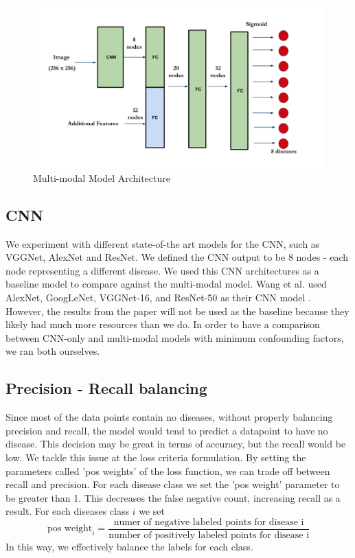 \documentclass[10pt,letterpaper]{article}
\begin{document}
\begin{figure}[h]
	\centering
	\includegraphics[scale=0.7]{./model_image.png}
	\caption{Multi-modal Model Architecture}
	\label{architecture}
\end{figure}

\subsection{CNN}
We experiment with different state-of-the art models for the CNN, such as VGGNet, AlexNet and ResNet. We defined the CNN output to be 8 nodes - each node representing a different disease. We used this CNN architectures as a baseline model to compare against the multi-modal model. Wang et al. used AlexNet, GoogLeNet, VGGNet-16, and ResNet-50 as their CNN model \cite{1705.02315}. However, the results from the paper will not be used as the baseline because they likely had much more resources than we do. In order to have a comparison between CNN-only and multi-modal models with minimum confounding factors, we ran both ourselves.

\subsection{Precision - Recall balancing}
Since most of the data points contain no diseases, without properly balancing precision and recall, the model would tend to predict a datapoint to have no disease. This decision may be great in terms of accuracy, but the recall would be low. We tackle this issue at the loss criteria formulation. By setting the parameters called 'pos weights' of the loss function, we can trade off between recall and precision. For each disease class we set the 'pos weight' parameter to be greater than 1. This decreases the false negative count, increasing recall as a result. For each diseases class $i$ we set 
$$ \text{pos weight}_i = \frac{\text{numer of negative labeled points for disease i}}{\text{number  of positively labeled points for disease i}}$$
In this way, we effectively balance the labels for each class. 
\end{document}
